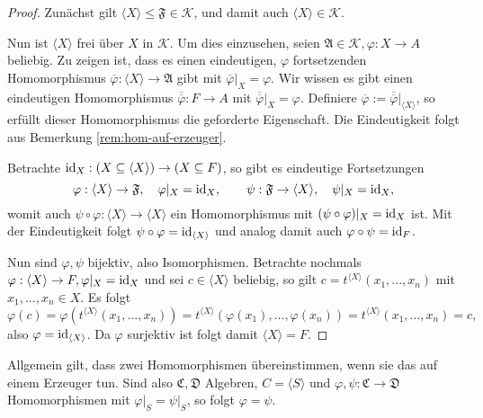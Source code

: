 \begin{proof}
    Zunächst gilt $ \langle X \rangle \leq \mathfrak{F} \in \mathcal{K} $, und damit auch $ \langle X \rangle \in \mathcal{K} $.

    Nun ist $ \langle X \rangle $ frei über $X$ in $\mathcal{K}$. Um dies einzusehen, seien $\mathfrak{A} \in \mathcal{K}, \varphi : X \to A$ beliebig. Zu zeigen ist, dass es einen eindeutigen, $\varphi$ fortsetzenden Homomorphismus $\overline{\varphi} : \langle X \rangle \to \mathfrak{A}$ gibt mit $\overline{\varphi} \vert_X = \varphi$. Wir wissen es gibt einen eindeutigen Homomorphismus $\overline{\overline{\varphi}} : F \to A$ mit $\overline{\overline{\varphi}} \vert_X = \varphi$. Definiere $\overline{\varphi} := \overline{\overline{\varphi}} \vert_{\langle X \rangle}$, so erfüllt dieser Homomorphismus die geforderte Eigenschaft. Die Eindeutigkeit folgt aus Bemerkung \ref{rem:hom-auf-erzeuger}.

    Betrachte $\operatorname{id}_X : (X \subseteq \langle X \rangle) \to (X \subseteq F)$, so gibt es eindeutige Fortsetzungen
    $$ \varphi : \langle X \rangle \to \mathfrak{F}, \quad \varphi \vert_X = \operatorname{id}_X, \quad\quad \psi : \mathfrak{F} \to \langle X \rangle, \quad \psi \vert_X = \operatorname{id}_X, $$
    womit auch $\psi \circ \varphi : \langle X \rangle \to \langle X \rangle$ ein Homomorphismus mit $(\psi \circ \varphi) \vert_X = \operatorname{id}_X$ ist. Mit der Eindeutigkeit folgt $\psi \circ \varphi = \operatorname{id}_{\langle X \rangle}$ und analog damit auch $\varphi \circ \psi = \operatorname{id}_F$.

    Nun sind $\varphi, \psi$ bijektiv, also Isomorphismen. Betrachte nochmals $\varphi : \langle X \rangle \to F, \varphi \vert_X = \operatorname{id}_X$ und sei $c \in \langle X \rangle$ beliebig, so gilt $c = t^{\langle X \rangle}(x_1, ..., x_n)$ mit $x_1, ..., x_n \in X$. Es folgt
    $$ \varphi(c) = \varphi(t^{\langle X \rangle}(x_1, ..., x_n)) = t^{\langle X \rangle}(\varphi(x_1), ..., \varphi(x_n)) = t^{\langle X \rangle}(x_1, ..., x_n) = c, $$
    also $\varphi = \operatorname{id}_{\langle X \rangle}$. Da $\varphi$ surjektiv ist folgt damit $\langle X \rangle = F$.
\end{proof}

\begin{remark} \label{rem:hom-auf-erzeuger}
    Allgemein gilt, dass zwei Homomorphismen übereinstimmen, wenn sie das auf einem Erzeuger tun. Sind also $\mathfrak{C}, \mathfrak{D}$ Algebren, $C = \langle S \rangle$ und $\varphi, \psi : \mathfrak{C} \to \mathfrak{D}$ Homomorphismen mit $\varphi \vert_S = \psi \vert_S$, so folgt $\varphi = \psi$.
\end{remark}

